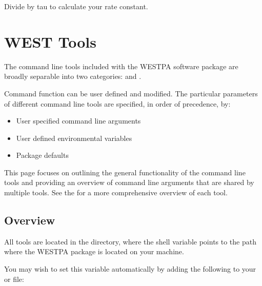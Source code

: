 \documentclass[letterpaper,10pt,english]{sphinxmanual}
\begin{document}
Divide by tau to calculate your rate constant.


\section{WEST Tools}
\label{\detokenize{users_guide/west_tools:west-tools}}\label{\detokenize{users_guide/west_tools::doc}}
The command line tools included with the WESTPA software package are broadly
separable into two categories:  and
.

Command function can be user defined and modified. The particular parameters of
different command line tools are specified, in order of precedence, by:
\begin{itemize}
\item {} 
User specified command line arguments

\item {} 
User defined environmental variables

\item {} 
Package defaults

\end{itemize}

This page focuses on outlining the general functionality of the command line
tools and providing an overview of command line arguments that are shared by
multiple tools. See the {\hyperref[\detokenize{users_guide/command_line_tools:command-line-tool-index}]{}} for a more comprehensive overview of each tool.


\subsection{Overview}
\label{\detokenize{users_guide/west_tools:overview}}
All tools are located in the  directory, where the shell
variable  points to the path where the WESTPA package is located
on your machine.

You may wish to set this variable automatically by adding the following to your
 or  file:

\begin{sphinxVerbatim}[commandchars=\\\{\}]
 
\end{sphinxVerbatim}
\end{document}
